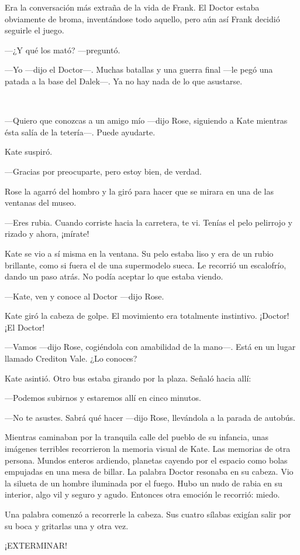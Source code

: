 Era la conversación más extraña de la vida de Frank. El Doctor estaba
obviamente de broma, inventándose todo aquello, pero aún así Frank
decidió seguirle el juego.

---¿Y qué los mató? ---preguntó.

---Yo ---dijo el Doctor---. Muchas batallas y una guerra final ---le pegó
una patada a la base del Dalek---. Ya no hay nada de lo que asustarse.

~

---Quiero que conozcas a un amigo mío ---dijo Rose, siguiendo a Kate
mientras ésta salía de la tetería---. Puede ayudarte.

Kate suspiró.

---Gracias por preocuparte, pero estoy bien, de verdad.

Rose la agarró del hombro y la giró para hacer que se mirara en una de
las ventanas del museo.

---Eres rubia. Cuando corriste hacia la carretera, te vi. Tenías el pelo
pelirrojo y rizado y ahora, ¡mírate!

Kate se vio a sí misma en la ventana. Su pelo estaba liso y era de un
rubio brillante, como si fuera el de una supermodelo sueca. Le recorrió
un escalofrío, dando un paso atrás. No podía aceptar lo que estaba
viendo.

---Kate, ven y conoce al Doctor ---dijo Rose.

Kate giró la cabeza de golpe. El movimiento era totalmente instintivo.
¡Doctor! ¡El Doctor!

---Vamos ---dijo Rose, cogiéndola con amabilidad de la mano---. Está en un
lugar llamado Crediton Vale. ¿Lo conoces?

Kate asintió. Otro bus estaba girando por la plaza. Señaló hacia allí:

---Podemos subirnos y estaremos allí en cinco minutos.

---No te asustes. Sabrá qué hacer ---dijo Rose, llevándola a la parada de
autobús.

Mientras caminaban por la tranquila calle del pueblo de su infancia,
unas imágenes terribles recorrieron la memoria visual de Kate. Las
memorias de otra persona. Mundos enteros ardiendo, planetas cayendo por
el espacio como bolas empujadas en una mesa de billar. La palabra Doctor
resonaba en su cabeza. Vio la silueta de un hombre iluminada por el
fuego. Hubo un nudo de rabia en su interior, algo vil y seguro y agudo.
Entonces otra emoción le recorrió: miedo.

Una palabra comenzó a recorrerle la cabeza. Sus cuatro sílabas exigían
salir por su boca y gritarlas una y otra vez.

¡EXTERMINAR!